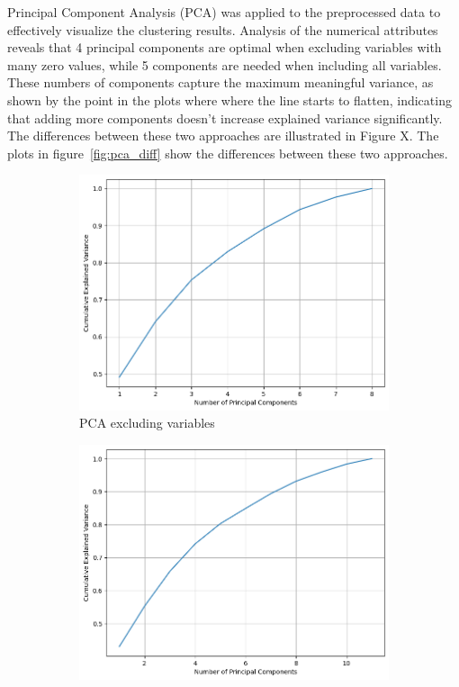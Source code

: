 Principal Component Analysis (PCA) was applied to the preprocessed data to effectively visualize the clustering results. 
Analysis of the numerical attributes reveals that 4 principal components are optimal when excluding variables with many zero values, while 5 components are needed when including all variables. 
These numbers of components capture the maximum meaningful variance, as shown by the point in the plots where where the line starts to flatten, indicating that adding more components doesn't increase explained variance significantly. 
The differences between these two approaches are illustrated in Figure X.
The plots in figure~\ref{fig:pca_diff} show the differences between these two approaches.
\begin{figure}[h]
    \centering
    \begin{subfigure}[b]{0.40\textwidth}
        \centering
        \includegraphics[width=\textwidth]{plots/pca_kmeans.png}
        \caption{PCA excluding variables}
        \label{fig:sse_silh_kmeans}
    \end{subfigure}
    \begin{subfigure}[b]{0.40\textwidth}
        \centering
        \includegraphics[width=\textwidth]{plots/pca5.png}

\end{subfigure}
\end{figure}
